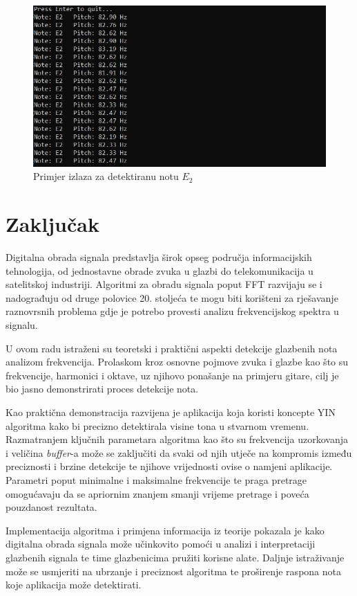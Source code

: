 \documentclass[times, utf8, diplomski, numeric]{fer}
\begin{document}
\begin{figure}
	\centerline{\includegraphics[width=1\textwidth]{example.png}}
	\caption{Primjer izlaza za detektiranu notu $E_2$}
	\label{fig}
\end{figure}

\chapter{Zaključak}
Digitalna obrada signala predstavlja širok opseg područja informacijskih tehnologija, od jednostavne obrade zvuka u glazbi do telekomunikacija u satelitskoj industriji. Algoritmi za obradu signala poput FFT razvijaju se i nadograđuju od druge polovice 20. stoljeća te mogu biti korišteni za rješavanje raznovrsnih problema gdje je potrebo provesti analizu frekvencijskog spektra u signalu.

U ovom radu istraženi su teoretski i praktični aspekti detekcije glazbenih nota analizom frekvencija. Prolaskom kroz osnovne pojmove zvuka i glazbe kao što su frekvencije, harmonici i oktave, uz njihovo ponašanje na primjeru gitare, cilj je bio jasno demonstrirati proces detekcije nota.

Kao praktična demonstracija razvijena je aplikacija koja koristi koncepte YIN algoritma kako bi precizno detektirala visine tona u stvarnom vremenu. Razmatranjem ključnih parametara algoritma kao što su frekvencija uzorkovanja i veličina \textit{buffer}-a može se zaključiti da svaki od njih utječe na kompromis između preciznosti i brzine detekcije te njihove vrijednosti ovise o namjeni aplikacije. Parametri poput minimalne i maksimalne frekvencije te praga pretrage omogućavaju da se apriornim znanjem smanji vrijeme pretrage i poveća pouzdanost rezultata.

Implementacija algoritma i primjena informacija iz teorije pokazala je kako digitalna obrada signala može učinkovito pomoći u analizi i interpretaciji glazbenih signala te time glazbenicima pružiti korisne alate. Daljnje istraživanje može se usmjeriti na ubrzanje i preciznost algoritma te proširenje raspona nota koje aplikacija može detektirati. 
\end{document}
